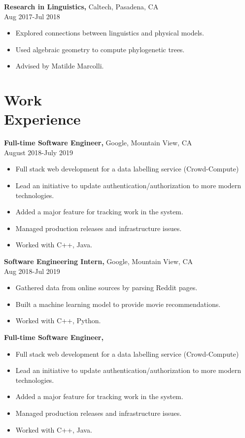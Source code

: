 \documentclass[margin]{res}
\begin{document}
\begin{resume}
{\bf Research in Linguistics,} Caltech, Pasadena, CA \\ Aug 2017-Jul 2018
\begin{itemize} \itemsep -2pt %
\item Explored connections between linguistics and physical models.
\item Used algebraic geometry to compute phylogenetic trees.
\item Advised by Matilde Marcolli.
\end{itemize}
 \section{Work\\ Experience}
 {\bf Full-time Software Engineer,} Google, Mountain View, CA \\ August 2018-July 2019
 \begin{itemize} \itemsep -2pt  %
 \item Full stack web development for a data labelling service (Crowd-Compute)
 \item Lead an initiative to update authentication/authorization to more modern technologies.
 \item Added a major feature for tracking work in the system.
 \item Managed production releases and infrastructure issues.
 \item Worked with C++, Java.
 \end{itemize}
 
{\bf Software Engineering Intern,} Google, Mountain View, CA \\ Aug 2018-Jul 2019
\begin{itemize} \itemsep -2pt %
\item Gathered data from online sources by parsing Reddit pages.
\item Built a machine learning model to provide movie recommendations.
\item Worked with C++, Python.
\end{itemize}

 {\bf Full-time Software Engineer,}\\
 \begin{itemize} \itemsep -2pt  %
 \item Full stack web development for a data labelling service (Crowd-Compute)
 \item Lead an initiative to update authentication/authorization to more modern technologies.
 \item Added a major feature for tracking work in the system.
 \item Managed production releases and infrastructure issues.
 \item Worked with C++, Java.
 \end{itemize}


\end{resume}
\end{document}
